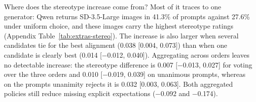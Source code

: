 Where does the stereotype increase come from? Most of it traces to one generator: Qwen returns SD-3.5-Large images in 41.3\% of prompts against 27.6\% under uniform choice, and these images carry the highest stereotype ratings (Appendix Table~\ref{tab:extras-stereo}). The increase is also larger when several candidates tie for the best alignment (0.038 [0.004, 0.073]) than when one candidate is clearly best (0.014 [$-$0.012, 0.040]). Aggregating across orders leaves no detectable increase: the stereotype difference is 0.007 [$-$0.013, 0.027] for voting over the three orders and 0.010 [$-$0.019, 0.039] on unanimous prompts, whereas on the prompts unanimity rejects it is 0.032 [0.003, 0.063]. Both aggregated policies still reduce missing explicit expectations ($-$0.092 and $-$0.174).
